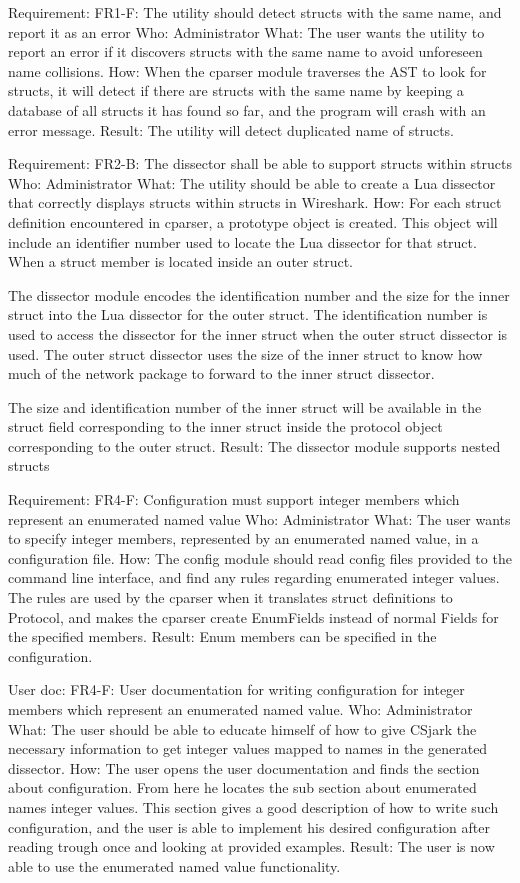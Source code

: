 Requirement: FR1-F: The utility should detect structs with the same name, and report it as an error
Who: Administrator
What: The user wants the utility to report an error if it discovers structs with the same name to avoid unforeseen name collisions.
How: When the cparser module traverses the AST to look for structs, it will detect if there are structs with the same name by keeping a database of all structs it has found so far, and the program will crash with an error message.
Result: The utility will detect duplicated name of structs.

Requirement: FR2-B: The dissector shall be able to support structs within structs
Who: Administrator
What: The utility should be able to create a Lua dissector that correctly displays structs within structs in Wireshark. 
How: For each struct definition encountered in cparser, a prototype object is created. This object will include an identifier number used to locate the Lua dissector for that struct. When a struct member is located inside an outer struct. 

The dissector module encodes the identification number and the size for the inner struct into the Lua dissector for the outer struct. The identification number is used to access the dissector for the inner struct when the outer struct dissector is used. The outer struct dissector uses the size of the inner struct to know how much of the network package to forward to the inner struct dissector.

The size and identification number of the inner struct will be available in the struct field corresponding to the inner struct inside the protocol object corresponding to the outer struct.
Result: The dissector module supports nested structs

Requirement: FR4-F: Configuration must support integer members which represent an enumerated named value
Who: Administrator
What: The user wants to specify integer members, represented by an enumerated named value, in a configuration file.
How: The config module should read config files provided to the command line interface, and find any rules regarding enumerated integer values. The rules are used by the cparser when it translates struct definitions to Protocol, and makes the cparser create EnumFields instead of normal Fields for the specified members.
Result: Enum members can be specified in the configuration.

User doc: FR4-F: User documentation for writing configuration for integer members which represent an enumerated named value.
Who: Administrator
What: The user should be able to educate himself of how to give CSjark the necessary information to get integer values mapped to names in the generated dissector.
How: The user opens the user documentation and finds the section about configuration. From here he locates the sub section about enumerated names integer values. This section gives a good description of how to write such configuration, and the user is able to implement his desired configuration after reading trough once and looking at provided examples.
Result: The user is now able to use the enumerated named value functionality.

